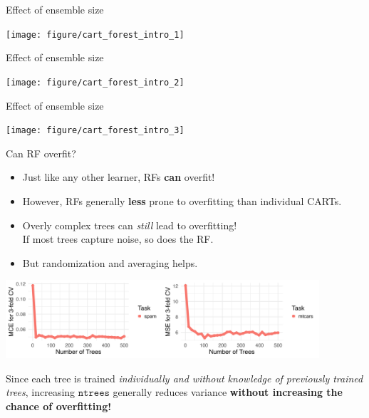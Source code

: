 \documentclass[11pt,compress,t,notes=noshow, xcolor=table]{beamer}
\begin{document}

\begin{vbframe}{Effect of ensemble size}

  {\centering \texttt{[image: figure/cart\_forest\_intro\_1]}}
\end{vbframe}

\begin{vbframe}{Effect of ensemble size}
\addtocounter{framenumber}{-1}
{\centering \texttt{[image: figure/cart\_forest\_intro\_2]}}
\end{vbframe}

\begin{vbframe}{Effect of ensemble size}
\addtocounter{framenumber}{-1}
{\centering \texttt{[image: figure/cart\_forest\_intro\_3]}}
\end{vbframe}

\begin{vbframe}{Can RF overfit? }

{\small
\begin{itemize}
  \item Just like any other learner, RFs \textbf{can} overfit!\\
  \item However, RFs generally \textbf{less} prone to overfitting than individual CARTs.
  \item Overly complex trees can \textit{still} lead to overfitting!\\
    If most trees capture noise, so does the RF.
  \item But randomization and averaging helps.
\end{itemize}

\begin{center}
\includegraphics[width=330pt]{figure/forest-ntree.png}
\end{center}


Since each tree is trained \textit{individually and without knowledge of previously trained trees}, increasing $\texttt{ntrees}$ generally reduces variance \textbf{without increasing the chance of overfitting!}
}
\end{vbframe}
\end{document}
